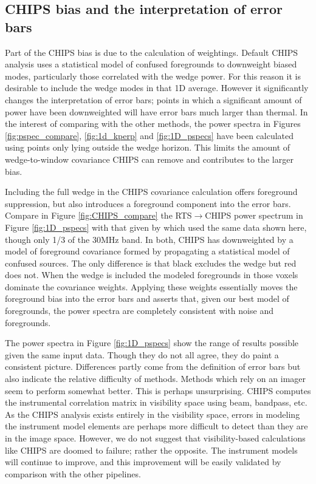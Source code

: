 \documentclass[twolcolumn,iop]{emulateapj}
\def\chipscite{\cite{2016arXiv160102073T}}
\begin{document}
\subsection{CHIPS bias and the interpretation of error bars}
Part of the CHIPS bias is due to the calculation of weightings. Default CHIPS analysis uses a statistical model of confused foregrounds to downweight biased modes, particularly those correlated with the wedge power. For this reason it is desirable to include the wedge modes in that 1D average. However it significantly changes the interpretation of error bars; points in which a significant amount of power have been downweighted will have error bars much larger than thermal. In the interest of comparing with the other methods, the power spectra in Figures \ref{fig:pspec_compare}, \ref{fig:1d_kperp} and \ref{fig:1D_pspecs} have been calculated using points only lying outside the wedge horizon. This limits the amount of wedge-to-window covariance CHIPS can remove and contributes to the larger bias. 

Including the full wedge in the CHIPS covariance calculation offers foreground suppression, but also introduces a foreground component into the error bars. Compare in Figure \ref{fig:CHIPS_compare} the RTS$\to$CHIPS power spectrum in Figure \ref{fig:1D_pspecs} with that given by \chipscite{} which used the same data shown here, though only 1/3 of the 30MHz band.  In both, CHIPS has downweighted by a model of foreground covariance formed by propagating a statistical model of confused sources. The only difference is that black excludes the wedge but red does not. When the wedge is included the modeled foregrounds in those voxels dominate the covariance weights. Applying these weights essentially moves the foreground bias into the error bars and asserts that, given our best model of foregrounds, the power spectra are completely consistent with noise and  foregrounds.

The power spectra in Figure \ref{fig:1D_pspecs} show the range of results possible given the same input data. Though they do not all agree, they do paint a consistent picture.  Differences partly come from the definition of error bars but also indicate the relative difficulty of methods. Methods which rely on an imager seem to perform somewhat better. This is perhaps unsurprising. CHIPS computes the instrumental correlation matrix in visibility space using beam, bandpass, etc. As the CHIPS analysis exists entirely in the visibility space, errors in modeling the instrument model elements are perhaps more difficult to detect than they are in the image space.  However, we do not suggest that visibility-based calculations like CHIPS are doomed to failure; rather the opposite. The instrument models will continue to improve, and this improvement will be easily validated by comparison with the other pipelines.
\end{document}
